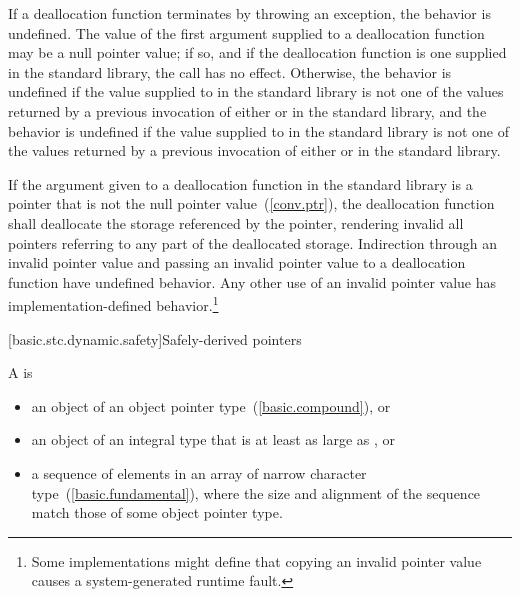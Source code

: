 \pnum
If a deallocation function terminates by throwing an exception, the behavior is undefined.
The value of the first argument supplied to a deallocation function may
be a null pointer value; if so, and if the deallocation function is one
supplied in the standard library, the call has no effect. Otherwise,
the behavior is undefined if
the
value supplied to   in the standard
library is not one of the values returned by a previous invocation of
either   or 
   in the
standard library, and
the behavior is undefined if
the value supplied to 
 in the standard library is not one of the
values returned by a previous invocation of either 
 or 
   in
the standard library.

\pnum
If the argument given to a deallocation function in the standard library
is a pointer that is not the null pointer value~(\ref{conv.ptr}), the
deallocation function shall deallocate the storage referenced by the
pointer, rendering invalid all pointers referring to any part of the
deallocated storage.
%
Indirection through an invalid pointer value and passing an invalid
pointer value to a deallocation function have undefined behavior. Any
other use of an invalid pointer value has implementation-defined
behavior.\footnote{Some implementations might define that copying an
  invalid pointer value causes a system-generated runtime fault.}

[basic.stc.dynamic.safety]{Safely-derived pointers}

\pnum
{}%
%
A  is

\begin{itemize}
\item an object of an object pointer
type~(\ref{basic.compound}), or
\item an object of an integral type that is at least as large as ,
or
\item a sequence of elements in an array of narrow character
type~(\ref{basic.fundamental}), where the size and alignment of the sequence
match those of some object pointer type.
\end{itemize}

